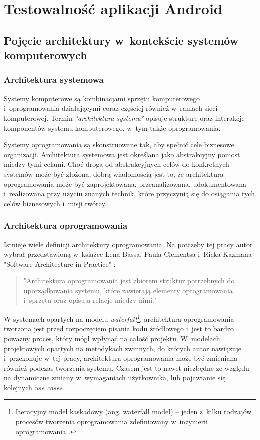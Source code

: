 \chapter{Testowalność aplikacji Android}
\label{opis_problemu}

\section{Pojęcie architektury w~kontekście systemów \newline komputerowych}
\subsection{Architektura systemowa}
Systemy komputerowe są kombinacjami sprzętu komputerowego i~oprogramowania działającymi coraz częściej również w~ramach sieci komputerowej. Termin \textit{"architektura systemu"} opisuje strukturę oraz interakcję komponentów systemu komputerowego, w~tym także oprogramowania.

Systemy oprogramowania są skonstruowane tak, aby spełnić cele biznesowe organizacji. Architektura systemowa jest określana jako abstrakcyjny pomost między tymi celami. Choć droga od abstrakcyjnych celów do konkretnych systemów może być złożona, dobrą wiadomością jest to, że architektura oprogramowania może być zaprojektowana, przeanalizowana, udokumentowana i~realizowana przy użyciu znanych technik, które przyczynią się do osiągania tych celów biznesowych i~misji twórcy. 


\subsection{Architektura oprogramowania}
Istnieje wiele definicji architektury oprogramowania. Na potrzeby tej pracy autor wybrał przedstawioną w~książce Lena Bassa, Paula Clementsa i~Ricka Kazmana "Software Architecture in Practice" \cite{bib:architect:software}:

\begin{quote}
"Architektura oprogramowania jest zbiorem struktur potrzebnych do uporządkowania systemu, które zawierają elementy oprogramowania i~sprzętu oraz opisują relacje między nimi." 
\end{quote}

W systemach opartych na modelu \textit{waterfall\footnote{Iteracyjny model kaskadowy (ang. waterfall model) – jeden z~kilku rodzajów procesów tworzenia oprogramowania zdefiniowany w~inżynierii oprogramowania \cite{website:wikipedia}.}}, architektura oprogramowania tworzona jest przed rozpoczęciem pisania kodu źródłowego i~jest to bardzo poważny proces, który mógł wpłynąć na całość projektu. W~modelach projektowych opartych na metodykach zwinnych, do których autor nawiązuje i~przekonuje w~tej pracy, architektura oprogramowania może być zmieniana również podczas tworzenia systemu. Czasem jest to nawet niezbędne ze względu na dynamiczne zmiany w~wymaganiach użytkownika, lub pojawianie się kolejnych \textit{use cases}.

